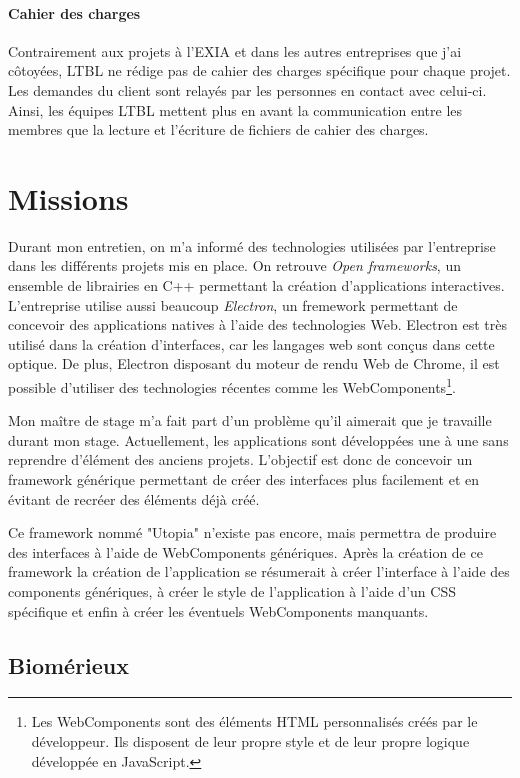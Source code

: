 \documentclass{article}
\begin{document}
\paragraph{Cahier des charges} Contrairement aux projets à l'EXIA et dans les autres entreprises que j'ai côtoyées, LTBL ne rédige pas de cahier des charges spécifique pour chaque projet.
Les demandes du client sont relayés par les personnes en contact avec celui-ci.
Ainsi, les équipes LTBL mettent plus en avant la communication entre les membres que la lecture et l'écriture de fichiers de cahier des charges.

\section{Missions}

Durant mon entretien, on m'a informé des technologies utilisées par l'entreprise dans les différents projets mis en place.
On retrouve \emph{Open frameworks}, un ensemble de librairies en C++ permettant la création d'applications interactives.
L'entreprise utilise aussi beaucoup \emph{Electron}, un fremework permettant de concevoir des applications natives à l'aide des technologies Web.
Electron est très utilisé dans la création d'interfaces, car les langages web sont conçus dans cette optique.
De plus, Electron disposant du moteur de rendu Web de Chrome, il est possible d'utiliser des technologies récentes comme les WebComponents\footnote{Les WebComponents sont des éléments HTML personnalisés créés par le développeur. Ils disposent de leur propre style et de leur propre logique développée en JavaScript.}.

Mon maître de stage m'a fait part d'un problème qu'il aimerait que je travaille durant mon stage.
Actuellement, les applications sont développées une à une sans reprendre d'élément des anciens projets.
L'objectif est donc de concevoir un framework générique permettant de créer des interfaces plus facilement et en évitant de recréer des éléments déjà créé.

Ce framework nommé "Utopia" n'existe pas encore, mais permettra de produire des interfaces à l'aide de WebComponents génériques.
Après la création de ce framework la création de l'application se résumerait à créer l'interface à l'aide des components génériques, à créer le style de l'application à l'aide d'un CSS spécifique et enfin à créer les éventuels WebComponents manquants.

\subsection{Biomérieux}
\end{document}
